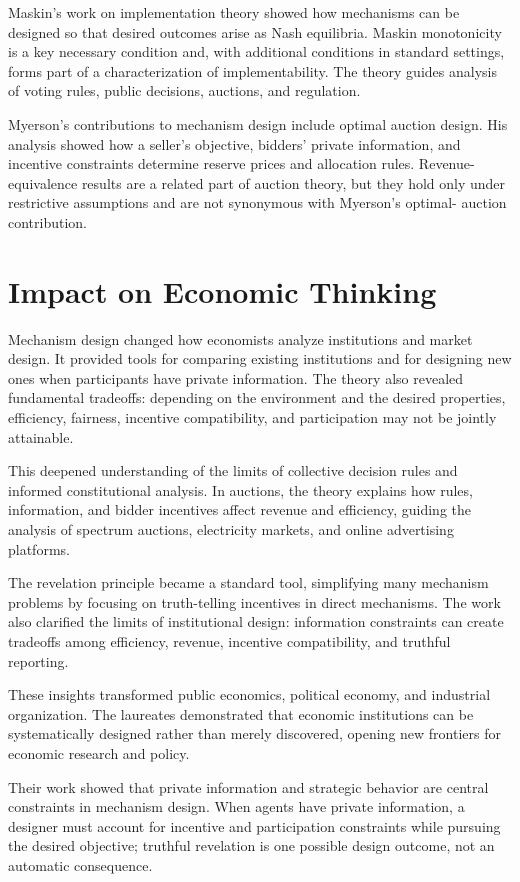 Maskin's work on implementation theory showed how mechanisms can be designed so
that desired outcomes arise as Nash equilibria. Maskin monotonicity is a key
necessary condition and, with additional conditions in standard settings, forms
part of a characterization of implementability. The theory guides analysis of
voting rules, public decisions, auctions, and regulation.

Myerson's contributions to mechanism design include optimal auction design. His
analysis showed how a seller's objective, bidders' private information, and
incentive constraints determine reserve prices and allocation rules. Revenue-
equivalence results are a related part of auction theory, but they hold only
under restrictive assumptions and are not synonymous with Myerson's optimal-
auction contribution.

\section{Impact on Economic Thinking}
Mechanism design changed how economists analyze institutions and market design.
It provided tools for comparing existing institutions and for designing new ones
when participants have private information. The theory also revealed fundamental
tradeoffs: depending on the environment and the desired properties, efficiency,
fairness, incentive compatibility, and participation may not be jointly
attainable.

This deepened understanding of the limits of collective decision rules and
informed constitutional analysis. In auctions, the theory explains how rules,
information, and bidder incentives affect revenue and efficiency, guiding the
analysis of spectrum auctions, electricity markets, and online advertising
platforms.

The revelation principle became a standard tool, simplifying many mechanism
problems by focusing on truth-telling incentives in direct mechanisms. The work
also clarified the limits of institutional design: information constraints can
create tradeoffs among efficiency, revenue, incentive compatibility, and
truthful reporting.

These insights transformed public economics, political economy, and industrial
organization. The laureates demonstrated that economic institutions can be
systematically designed rather than merely discovered, opening new frontiers
for economic research and policy.

Their work showed that private information and strategic behavior are central
constraints in mechanism design. When agents have private information, a
designer must account for incentive and participation constraints while pursuing
the desired objective; truthful revelation is one possible design outcome, not
an automatic consequence.

